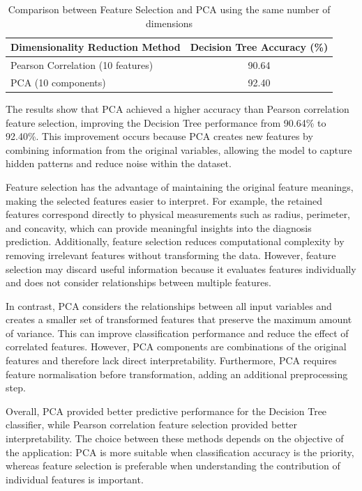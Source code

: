 \documentclass[a4paper,12pt]{article}
\begin{document}
\begin{table}[h]
	\centering
	\small
	\begin{tabular}{l c}
		\hline
		\textbf{Dimensionality Reduction Method} & \textbf{Decision Tree Accuracy (\%)} \\
		\hline
		Pearson Correlation (10 features) & 90.64 \\
		PCA (10 components) & 92.40 \\
		\hline
	\end{tabular}
	\caption{Comparison between Feature Selection and PCA using the same number of dimensions}
	\label{tab:pca_vs_feature_selection}
\end{table}

The results show that PCA achieved a higher accuracy than Pearson correlation feature selection, improving the Decision Tree performance from 90.64\% to 92.40\%. This improvement occurs because PCA creates new features by combining information from the original variables, allowing the model to capture hidden patterns and reduce noise within the dataset.

Feature selection has the advantage of maintaining the original feature meanings, making the selected features easier to interpret. For example, the retained features correspond directly to physical measurements such as radius, perimeter, and concavity, which can provide meaningful insights into the diagnosis prediction. Additionally, feature selection reduces computational complexity by removing irrelevant features without transforming the data. However, feature selection may discard useful information because it evaluates features individually and does not consider relationships between multiple features.

In contrast, PCA considers the relationships between all input variables and creates a smaller set of transformed features that preserve the maximum amount of variance. This can improve classification performance and reduce the effect of correlated features. However, PCA components are combinations of the original features and therefore lack direct interpretability. Furthermore, PCA requires feature normalisation before transformation, adding an additional preprocessing step.

Overall, PCA provided better predictive performance for the Decision Tree classifier, while Pearson correlation feature selection provided better interpretability. The choice between these methods depends on the objective of the application: PCA is more suitable when classification accuracy is the priority, whereas feature selection is preferable when understanding the contribution of individual features is important.
\end{document}
